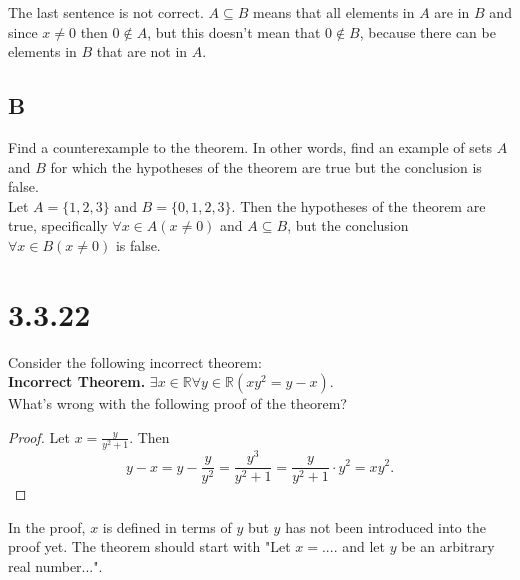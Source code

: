 \documentclass{article}
\newcommand{\n}{ \noindent }
\begin{document}
\n The last sentence is not correct. $A \subseteq B$ means that all elements in $A$ are in $B$ and since $x \neq 0$ then $0 \notin A$, but this doesn't mean that $0 \notin B$, because there can be elements in $B$ that are not in $A$.

\subsection*{B}
Find a counterexample to the theorem. In other words, find an example
of sets $A$ and $B$ for which the hypotheses of the theorem are
true but the conclusion is false. \\

\n Let $A = \{1,2,3\}$ and $B = \{0,1,2,3\}$. Then the hypotheses of the theorem are true, specifically $\forall x \in A (x \neq 0)$ and $A \subseteq B$, but the conclusion $\forall x \in B (x \neq 0)$ is false.

\section*{3.3.22}
Consider the following incorrect theorem: \\

\n \textbf{Incorrect Theorem.} $\exists x \in \mathbb{R} \forall y \in \mathbb{R} (xy^2 = y - x)$. \\

\n What's wrong with the following proof of the theorem? \\

\begin{proof}
Let $x = \tfrac{y}{y^2+1}$. Then \\
\begin{equation*}
y - x = y - \frac{y}{y^2} = \frac{y^3}{y^2 + 1} = \frac{y}{y^2 + 1} \cdot y^2 = xy^2.
\end{equation*}
\end{proof}

\n In the proof, $x$ is defined in terms of $y$ but $y$ has not been introduced into the proof yet. The theorem should start with "Let $x = ...$. and let $y$ be an arbitrary real number...".
\end{document}
